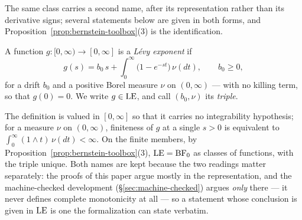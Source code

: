 The same class carries a second name, after its representation rather than its derivative
signs; several statements below are given in both forms, and
Proposition~\ref{prop:bernstein-toolbox}(3) is the identification.

\begin{definition}\label{def:levy-exponent}
A function $g : [0,\infty) \to [0,\infty]$ is a \emph{Lévy exponent} if
\[
  g(s) = b_0\,s + \int_0^\infty \bigl(1 - e^{-st}\bigr)\,\nu(dt),
  \qquad b_0 \ge 0,
\]
for a drift $b_0$ and a positive Borel measure $\nu$ on $(0,\infty)$ --- with no killing term,
so that $g(0) = 0$. We write $g \in \mathrm{LE}$, and call $(b_0, \nu)$ its \emph{triple}.
\end{definition}

The definition is valued in $[0,\infty]$ so that it carries no integrability hypothesis;
for a measure $\nu$ on $(0,\infty)$, finiteness of $g$ at a single $s > 0$ is equivalent to
$\int_0^\infty (1 \wedge t)\,\nu(dt) < \infty$. On the finite members, by
Proposition~\ref{prop:bernstein-toolbox}(3), $\mathrm{LE} = \mathrm{BF}_0$ as classes of functions, with the
triple unique. Both names are kept because the two readings matter separately: the proofs
of this paper argue mostly in the representation, and the machine-checked development
(\S\ref{sec:machine-checked}) argues \emph{only} there --- it never defines complete
monotonicity at all --- so a statement whose conclusion is given in $\mathrm{LE}$ is one the
formalization can state verbatim.

